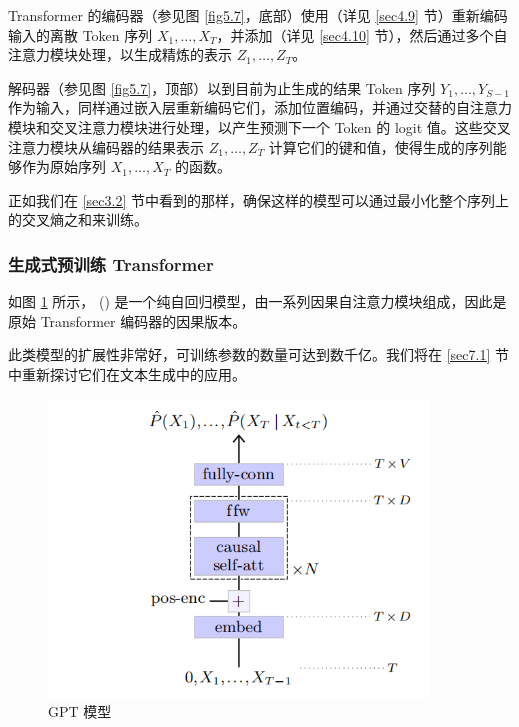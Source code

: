 Transformer 的编码器（参见图 \ref{fig5.7}，底部）使用（详见 \ref{sec4.9} 节）重新编码输入的离散 Token 序列 $X_1,\dots,X_T$，并添加（详见 \ref{sec4.10} 节），然后通过多个自注意力模块处理，以生成精炼的表示 $Z_1,\dots,Z_T$。

解码器（参见图 \ref{fig5.7}，顶部）以到目前为止生成的结果 Token 序列 $Y_1,\dots,Y_{S-1}$ 作为输入，同样通过嵌入层重新编码它们，添加位置编码，并通过交替的自注意力模块和交叉注意力模块进行处理，以产生预测下一个 Token 的 logit 值。这些交叉注意力模块从编码器的结果表示 $Z_1,\dots,Z_T$ 计算它们的键和值，使得生成的序列能够作为原始序列 $X_1,\dots,X_T$ 的函数。

正如我们在 \ref{sec3.2} 节中看到的那样，确保这样的模型可以通过最小化整个序列上的交叉熵之和来训练。

\subsubsection*{生成式预训练 Transformer}

如图 \ref{fig5.8} 所示， ()  \citep{Radford2018, Radford2019} 是一个纯自回归模型，由一系列因果自注意力模块组成，因此是原始 Transformer 编码器的因果版本。

此类模型的扩展性非常好，可训练参数的数量可达到数千亿。我们将在 \ref{sec7.1} 节中重新探讨它们在文本生成中的应用。

\begin{figure}
    \centering
    \includegraphics[width=0.9\textwidth]{fig/fig5.8.png}
    \caption[GPT 模型]{GPT 模型}
    \label{fig5.8}
\end{figure}

